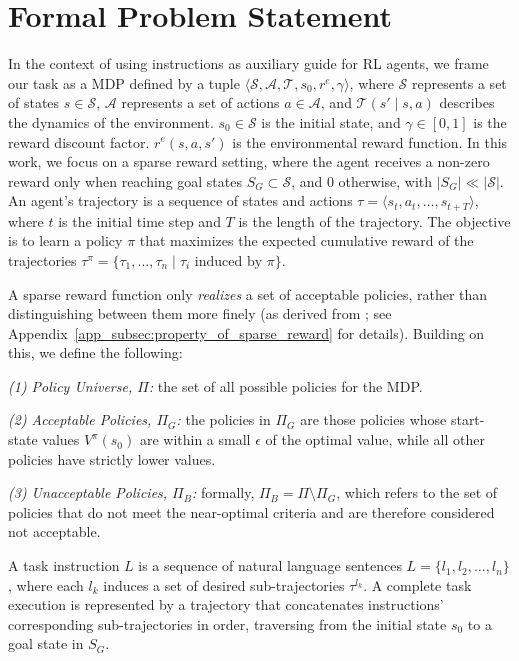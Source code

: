 \documentclass{article}
\theoremstyle{plain}
\theoremstyle{definition}
\theoremstyle{remark}
\begin{document}
\section{Formal Problem Statement}
\label{sec:background}

In the context of using instructions as auxiliary guide for RL agents, we frame our task as a MDP defined by a tuple $\langle \mathcal S, \mathcal A, \mathcal T, s_0, r^{\mathit{e}}, \gamma \rangle$, where $\mathcal S$ represents a set of states $s \in \mathcal S$, $\mathcal A$ represents a set of actions $a \in \mathcal A$, and $\mathcal T(s' \mid s, a)$ describes the dynamics of the environment. $s_0 \in \mathcal S$ is the initial state, and $\gamma \in [0,1]$ is the reward discount factor. $r^{\mathit{e}}(s, a, s')$ is the environmental reward function. In this work, we focus on a sparse reward setting, where the agent receives a non-zero reward only when reaching goal states $S_G \subset \mathcal{S}$, and 0 otherwise, with $|S_G| \ll |\mathcal{S}|$. An agent's trajectory is a sequence of states and actions $\tau = \langle s_t, a_t, \ldots, s_{t+T} \rangle$, where $t$ is the initial time step and $T$ is the length of the trajectory. The objective is to learn a policy $\pi$ that maximizes the expected cumulative reward of the trajectories $\tau^\pi = \{\tau_1, ..., \tau_n \mid \tau_i \text{ induced by } \pi\}$.

A sparse reward function only \emph{realizes} a set of acceptable policies, rather than distinguishing between them more finely (as derived from \citet{Abel2021OnTE}; see Appendix~\ref{app_subsec:property_of_sparse_reward} for details). Building on this, we define the following:

\emph{(1) Policy Universe, $\Pi$:} the set of all possible policies for the MDP. 

\emph{(2) Acceptable Policies, $\Pi_G$:} the policies in $\Pi_G$ are those policies whose start-state values $V^{\pi}(s_0)$ are within a small $\epsilon$ of the optimal value, while all other policies have strictly lower values.

\emph{(3) Unacceptable Policies, $\Pi_B$:} formally, $\Pi_B = \Pi \setminus \Pi_G$, which refers to the set of policies that do not meet the near-optimal criteria and are therefore considered not acceptable.

A task instruction $L$ is a sequence of natural language sentences $L = \{l_1, l_2, \ldots, l_n\}$, where each $l_k$ induces a set of desired sub-trajectories $\tau^{l_k}$. A complete task execution is represented by a trajectory that concatenates instructions' corresponding sub-trajectories in order, traversing from the initial state $s_0$ to a goal state in $S_G$. 
\end{document}
